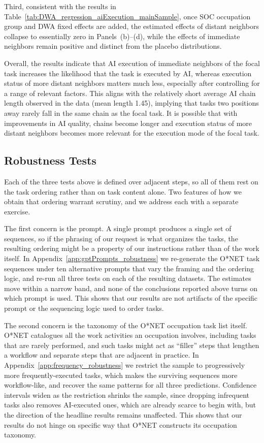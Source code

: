 Third, consistent with the results in Table~\ref{tab:DWA_regression_aiExecution_mainSample}, once SOC occupation group and DWA fixed effects are added, the estimated effects of distant neighbors collapse to essentially zero in Panels~(b)--(d), while the effects of immediate neighbors remain positive and distinct from the placebo distributions.

Overall, the results indicate that AI execution of immediate neighbors of the focal task increases the likelihood that the task is executed by AI, whereas execution status of more distant neighbors matters much less, especially after controlling for a range of relevant factors.
This aligns with the relatively short average AI chain length observed in the data (mean length 1.45), implying that tasks two positions away rarely fall in the same chain as the focal task.
It is possible that with improvements in AI quality, chains become longer and execution status of more distant neighbors becomes more relevant for the execution mode of the focal task.


\subsection{Robustness Tests}
\label{sec:robustness}

Each of the three tests above is defined over adjacent steps, so all of them rest on the task ordering rather than on task content alone.
Two features of how we obtain that ordering warrant scrutiny, and we address each with a separate exercise.

The first concern is the prompt.
A single prompt produces a single set of sequences, so if the phrasing of our request is what organizes the tasks, the resulting ordering might be a property of our instructions rather than of the work itself.
In Appendix~\ref{app:gptPrompts_robustness} we re-generate the O*NET task sequences under ten alternative prompts that vary the framing and the ordering logic, and re-run all three tests on each of the resulting datasets.
The estimates move within a narrow band, and none of the conclusions reported above turns on which prompt is used.
This shows that our results are not artifacts of the specific prompt or the sequencing logic used to order tasks.

The second concern is the taxonomy of the O*NET occupation task list itself.
O*NET catalogues all the work activities an occupation involves, including tasks that are rarely performed, and such tasks might act as ``filler'' steps that lengthen a workflow and separate steps that are adjacent in practice.
In Appendix~\ref{app:frequency_robustness} we restrict the sample to progressively more frequently-executed tasks, which makes the surviving sequences more workflow-like, and recover the same patterns for all three predictions.
Confidence intervals widen as the restriction shrinks the sample, since dropping infrequent tasks also removes AI-executed ones, which are already scarce to begin with, but the direction of the headline results remains unaffected.
This shows that our results do not hinge on specific way that O*NET constructs its occupation taxonomy.

